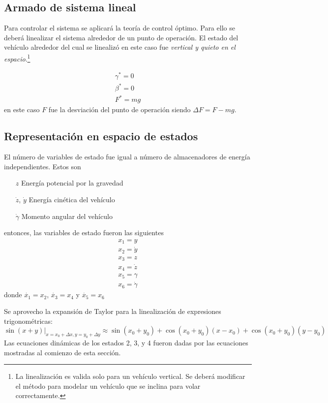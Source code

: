 \subsection{Armado de sistema lineal}
Para controlar el sistema se aplicará la teoría de control óptimo. Para ello se deberá linealizar el sistema alrededor de un punto de operación. El estado del vehículo alrededor del cual se linealizó en este caso fue \textit{vertical y quieto en el espacio}.\footnote{La linealización es valida solo para un vehículo vertical. Se deberá modificar el método para modelar un vehículo que se inclina para volar correctamente.} 

\begin{align*}
	\gamma^* = 0 \\
	\beta^* = 0 \\
	F^* = mg
\end{align*}
en este caso $F$ fue la desviación del punto de operación siendo $\Delta F = F- mg$.

\subsection{Representación en espacio de estados}
El número de variables de estado fue igual a número de almacenadores de energía independientes. Estos son

\begin{enumerate}
	\item[$z$] Energía potencial por la gravedad
	\item[$\dot{z}$,] $\dot{y}$  Energía cinética del vehículo
	\item[$\dot{\gamma}$] Momento angular del vehículo
\end{enumerate}
entonces, las variables de estado fueron las siguientes
\begin{align*}
	x_1 = y \\
	x_2 = \dot{y} \\
	x_3 = z \\
	x_4 = \dot{z} \\
	x_5 = \gamma \\
	x_6 = \dot{\gamma}
\end{align*}
donde $\dot{x_1} = x_2$, $\dot{x_3} = x_4$ y $\dot{x_5} = x_6$

Se aprovecho la expansión de Taylor para la linealización de expresiones trigonométricas:
\[
\sin(x+y)|_{x=x_0+\Delta x,y=y_0+\Delta y} \approx \sin(x_0+y_0) + \cos(x_0 + y_0) (x-x_0) + \cos(x_0 + y_0) (y-y_0)
\]
Las ecuaciones dinámicas de los estados 2, 3, y 4 fueron dadas por las ecuaciones mostradas al comienzo de esta sección.

